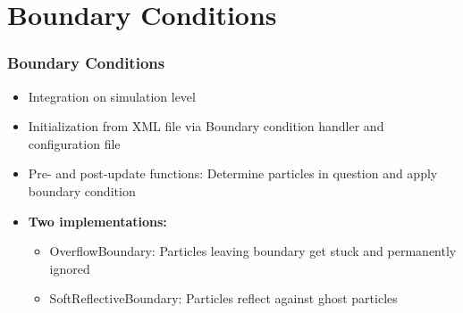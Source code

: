 
\section{Boundary Conditions}
\label{sec:boundary}

\begin{frame}
    \frametitle{Boundary Conditions}
    \begin{itemize}
        \item Integration on simulation level
        \item Initialization from XML file via Boundary condition handler and configuration file
        \item Pre- and post-update functions: Determine particles in question and apply boundary condition
        \item \textbf{Two implementations:}
        \begin{itemize}
            \item OverflowBoundary: Particles leaving boundary get stuck and permanently ignored
            \item SoftReflectiveBoundary: Particles reflect against ghost particles
        \end{itemize}
    \end{itemize}
\end{frame}
